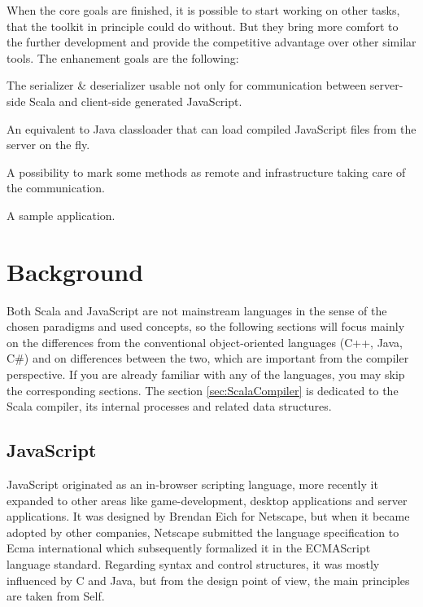 \documentclass[12pt,a4paper]{report}
\begin{document}
When the core goals are finished, it is possible to start working on other tasks, that the toolkit in principle could do without. But they bring more comfort to the further development and provide the competitive advantage over other similar tools. The enhanement goals are the following:

\begin{description}[style=multiline,leftmargin=5cm]
\item[7 - Serialization] The serializer \& deserializer usable not only for communication between server-side Scala and client-side generated JavaScript.
\item[8 - Loading] An equivalent to Java classloader that can load compiled JavaScript files from the server on the fly.
\item[9 - RPC] A possibility to mark some methods as remote and infrastructure taking care of the communication.
\item[10 - Application] A sample application.
\end{description}



\chapter{Background}

Both Scala and JavaScript are not mainstream languages in the sense of the chosen paradigms and used concepts, so the following sections will focus mainly on the differences from the conventional object-oriented languages (C++, Java, C\#) and on differences between the two, which are important from the compiler perspective. If you are already familiar with any of the languages, you may skip the corresponding sections. The section \ref{sec:ScalaCompiler} is dedicated to the Scala compiler, its internal processes and related data structures.

\section{JavaScript}

JavaScript\cite{JavaScript} originated as an in-browser scripting language, more recently it expanded to other areas like game-development, desktop applications and server applications. It was designed by Brendan Eich for Netscape, but when it became adopted by other companies, Netscape submitted the language specification to Ecma international which subsequently formalized it in the ECMAScript language standard\cite{EcmaScript}. Regarding syntax and control structures, it was mostly influenced by C and Java, but from the design point of view, the main principles are taken from Self\cite{Self}.
\end{document}
